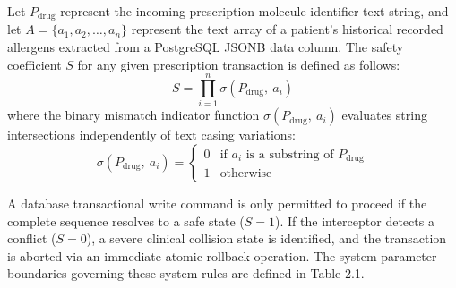 \documentclass[12pt, a4paper]{report}
\numberwithin{equation}{chapter}
\begin{document}
Let $P_{\text{drug}}$ represent the incoming prescription molecule identifier text string, and let $A = \{a_1, a_2, \dots, a_n\}$ represent the text array of a patient's historical recorded allergens extracted from a PostgreSQL JSONB data column. The safety coefficient $S$ for any given prescription transaction is defined as follows:
\begin{equation}
    S = \prod_{i=1}^{n} \sigma(P_{\text{drug}},\ a_i)
\end{equation}
where the binary mismatch indicator function $\sigma(P_{\text{drug}},\ a_i)$ evaluates string intersections independently of text casing variations:
\begin{equation}
    \sigma(P_{\text{drug}},\ a_i) = 
    \begin{cases} 
        0 & \text{if\ } a_i \text{\ is\ a\ substring\ of\ } P_{\text{drug}} \\ 
        1 & \text{otherwise} 
    \end{cases}
\end{equation}

A database transactional write command is only permitted to proceed if the complete sequence resolves to a safe state ($S = 1$). If the interceptor detects a conflict ($S = 0$), a severe clinical collision state is identified, and the transaction is aborted via an immediate atomic rollback operation. The system parameter boundaries governing these system rules are defined in Table 2.1.

\begin{table}[h!]
\centering
\caption{Clinical Safety and System Execution Parameters}
\label{tab:safety_parameters}

\end{table}
\end{document}
